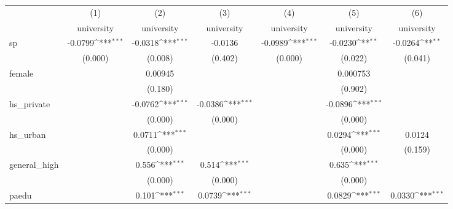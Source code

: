 {
\def\sym#1{\ifmmode^{#1}\else\(^{#1}\)\fi}
\begin{tabular}{l*{6}{c}}
\hline\hline
            &\multicolumn{1}{c}{(1)}&\multicolumn{1}{c}{(2)}&\multicolumn{1}{c}{(3)}&\multicolumn{1}{c}{(4)}&\multicolumn{1}{c}{(5)}&\multicolumn{1}{c}{(6)}\\
            &\multicolumn{1}{c}{university}&\multicolumn{1}{c}{university}&\multicolumn{1}{c}{university}&\multicolumn{1}{c}{university}&\multicolumn{1}{c}{university}&\multicolumn{1}{c}{university}\\
\hline
sp          &     -0.0799\sym{***}&     -0.0318\sym{***}&     -0.0136         &     -0.0989\sym{***}&     -0.0230\sym{**} &     -0.0264\sym{**} \\
            &     (0.000)         &     (0.008)         &     (0.402)         &     (0.000)         &     (0.022)         &     (0.041)         \\
[1em]
female      &                     &     0.00945         &                     &                     &    0.000753         &                     \\
            &                     &     (0.180)         &                     &                     &     (0.902)         &                     \\
[1em]
hs\_private  &                     &     -0.0762\sym{***}&     -0.0386\sym{***}&                     &     -0.0896\sym{***}&                     \\
            &                     &     (0.000)         &     (0.000)         &                     &     (0.000)         &                     \\
[1em]
hs\_urban    &                     &      0.0711\sym{***}&                     &                     &      0.0294\sym{***}&      0.0124         \\
            &                     &     (0.000)         &                     &                     &     (0.000)         &     (0.159)         \\
[1em]
general\_high&                     &       0.556\sym{***}&       0.514\sym{***}&                     &       0.635\sym{***}&                     \\
            &                     &     (0.000)         &     (0.000)         &                     &     (0.000)         &                     \\
[1em]
paedu       &                     &       0.101\sym{***}&      0.0739\sym{***}&                     &      0.0829\sym{***}&      0.0330\sym{***}\\

\end{tabular}}
